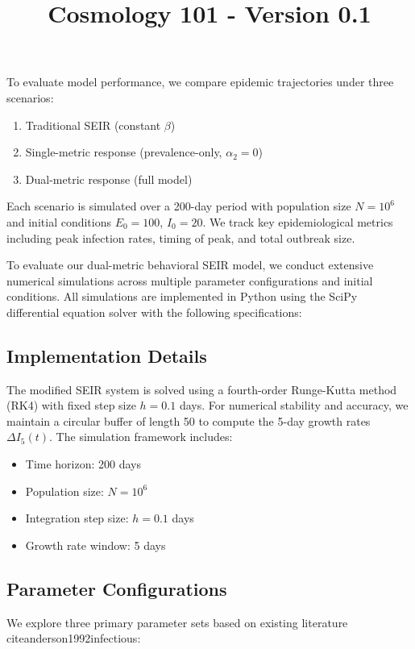 \documentclass{article}\usepackage{graphicx} \usepackage{amsmath} \usepackage{colortbl}\title{Cosmology 101 - Version 0.1}
\begin{document}
To evaluate model performance, we compare epidemic trajectories under three scenarios:
\begin{enumerate}
    \item Traditional SEIR (constant $\beta$)
    \item Single-metric response (prevalence-only, $\alpha_2 = 0$)
    \item Dual-metric response (full model)
\end{enumerate}

Each scenario is simulated over a 200-day period with population size $N = 10^6$ and initial conditions $E_0 = 100$, $I_0 = 20$. We track key epidemiological metrics including peak infection rates, timing of peak, and total outbreak size.

To evaluate our dual-metric behavioral SEIR model, we conduct extensive numerical simulations across multiple parameter configurations and initial conditions. All simulations are implemented in Python using the SciPy differential equation solver with the following specifications:

\subsection{Implementation Details}

The modified SEIR system is solved using a fourth-order Runge-Kutta method (RK4) with fixed step size $h = 0.1$ days. For numerical stability and accuracy, we maintain a circular buffer of length 50 to compute the 5-day growth rates $\Delta I_5(t)$. The simulation framework includes:

\begin{itemize}
    \item Time horizon: 200 days
    \item Population size: $N = 10^6$
    \item Integration step size: $h = 0.1$ days
    \item Growth rate window: 5 days
\end{itemize}

\subsection{Parameter Configurations}

We explore three primary parameter sets based on existing literature \\cite{anderson1992infectious}:
\end{document}
